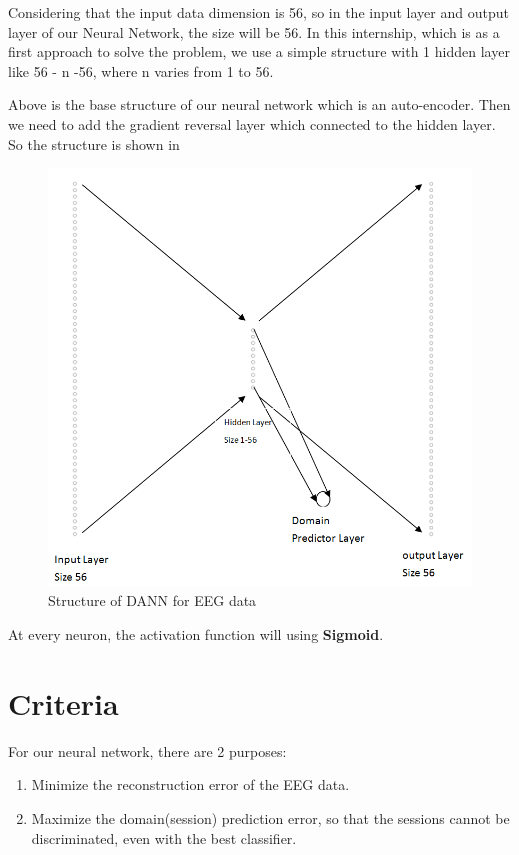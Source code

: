 Considering that the input data dimension is 56, so in the input layer and output layer of our Neural Network, the size will be 56. In this internship, which is as a first approach to solve the problem, we use a simple structure with 1 hidden layer like 56 - n -56, where n varies from 1 to 56. 

Above is the base structure of our neural network which is an auto-encoder. Then we need to add the gradient reversal layer which connected to the hidden layer. So the structure is shown in 

\begin{figure}[htbp]
	\centering
	\includegraphics[width=15cm]{Figures/eegstructure.png}
	\caption[Structure of DANN for EEG data]{Structure of DANN for EEG data}
	\label{fig:eegstructure}
\end{figure}


At every neuron, the activation function will using \textbf{Sigmoid}.


\section{Criteria}
For our neural network, there are 2 purposes:
\begin{enumerate}
	\item Minimize the reconstruction error of the EEG data.
	\item Maximize the domain(session) prediction error, so that the sessions cannot be discriminated, even with the best classifier.
\end{enumerate}

